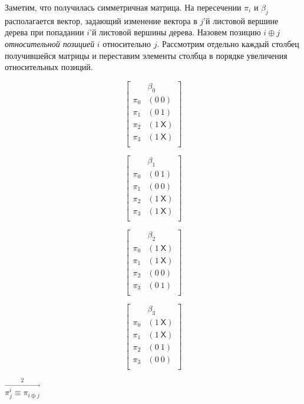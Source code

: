 \documentclass[14pt]{extreport}
\begin{document}
Заметим, что получилась симметричная матрица. На пересечении $\pi_i$
и $\beta_j$ располагается вектор, задающий изменение вектора в $j$'й
листовой вершине дерева при попадании $i$'й листовой вершины
дерева. Назовем позицию $i \oplus j$ \emph{относительной позицией}
$i$ относительно $j$. Рассмотрим отдельно каждый столбец
получившейся матрицы и переставим элементы столбца в порядке
увеличения относительных позиций.

\parbox{0.2\textwidth}{
$$ \left[
  \begin{array}{c|c}
          & \beta_0 \\ \hline
    \pi_0 & (0~0) \\
    \pi_1 & (0~1) \\
    \pi_2 & (1~\textsf{X}) \\
    \pi_3 & (1~\textsf{X}) \\
  \end{array}
\right]
$$
}\parbox{0.2\textwidth}{
$$ \left[
  \begin{array}{c|c}
          & \beta_1 \\ \hline
    \pi_0 & (0~1) \\
    \pi_1 & (0~0) \\
    \pi_2 & (1~\textsf{X}) \\
    \pi_3 & (1~\textsf{X}) \\
  \end{array}
\right]
$$
}\parbox{0.2\textwidth}{
$$ \left[
  \begin{array}{c|c}
          & \beta_2 \\ \hline
    \pi_0 & (1~\textsf{X}) \\
    \pi_1 & (1~\textsf{X}) \\
    \pi_2 & (0~0) \\
    \pi_3 & (0~1) \\
  \end{array}
\right]
$$
}\parbox{0.2\textwidth}{
$$ \left[
  \begin{array}{c|c}
          & \beta_3 \\ \hline
    \pi_0 & (1~\textsf{X}) \\
    \pi_1 & (1~\textsf{X}) \\
    \pi_2 & (0~1) \\
    \pi_3 & (0~0) \\
  \end{array}
\right]
$$
} $\stackrel{2}{\stackrel{\longrightarrow}{\pi^i_j \equiv \pi_{i
\oplus j}}}$
\end{document}
